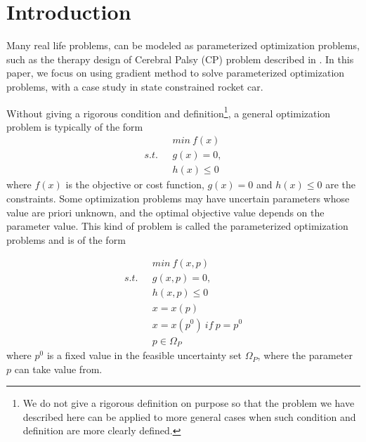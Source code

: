 \documentclass  [
  paper    = a4,
  BCOR     = 10mm,
  twoside,
  fontsize = 12pt,
  fleqn,
  toc      = bibnumbered,
  toc      = listofnumbered,
  numbers  = noendperiod,
  headings = normal,
  listof   = leveldown,
  version  = 3.03
]                                       {scrreprt}
\newcommand{\<}{\langle}
\renewcommand{\>}{\rangle}
\begin{document}
   
   \tableofcontents
    \let\clearpage\relax
   \newpage
   
   
   \chapter{Introduction}
   
   Many real life problems, can be modeled as parameterized optimization problems, such as the therapy design of Cerebral Palsy (CP) problem described in \cite{MatSch22}. In this paper, we focus on using gradient method to solve parameterized optimization problems, with a case study in state constrained rocket car. 
   
   Without giving a rigorous condition and definition\footnote{We do not give a rigorous definition on purpose so that the problem we have described here can be applied to more general cases when such condition and definition are more clearly defined.},  a general optimization problem is typically of the form
   \begin{equation}
   \begin{aligned}
   \  \  \ & min \  f(x) \\
   s.t.  \  \  \ & g(x) = 0, \\ 
   &  h(x)  \leq  0 
   \end{aligned}
   \label{GeneralMin}
   \end{equation}
   where $f(x)$ is the objective or cost function, $g(x) = 0$ and $h(x)  \leq  0$ are the constraints. Some optimization problems may have uncertain parameters whose value are priori unknown, and the optimal objective value depends on the parameter value. This kind of problem is called the parameterized optimization problems and is of the form 
   
   
   \begin{equation}
   \begin{aligned}
   \  \  \ & min \  f(x, p) \\
   s.t.  \  \  \ & g(x, p) = 0, \\ 
   &  h(x,p)  \leq  0  \\ 
   & x = x(p) \\
   & x = x(p^0) \  if \  p = p^0 \\
   & p \in \Omega_P		
   \end{aligned}
   \label{ParaMin}
   \end{equation}
   where $p^0$ is a fixed value in the feasible uncertainty set $\Omega_P$, where the parameter $p$ can take value from.
   
\end{document}
